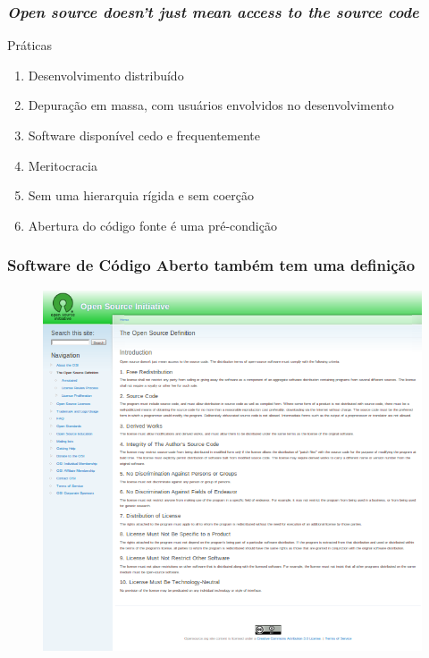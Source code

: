 \documentclass[xcolor=dvipsnames]{beamer}
\begin{document}
\begin{frame}
	\frametitle{\textit{Open source doesn't just mean access to the source 
code}}
	\begin{block}{Práticas}
    \begin{enumerate}
      \item Desenvolvimento distribuído %
      \item Depuração em massa, com usuários envolvidos no desenvolvimento 
      \item Software disponível cedo e frequentemente %
      \item Meritocracia %
      \item Sem uma hierarquia rígida e sem coerção
      \item Abertura do código fonte é uma pré-condição
    \end{enumerate}
 	\end{block}
\end{frame}


\begin{frame}
	\frametitle{Software de Código Aberto também tem uma definição}
	\begin{figure}
	\includegraphics[scale=0.35]{osd.png}
	\end{figure}

	\end{frame}
\end{document}
